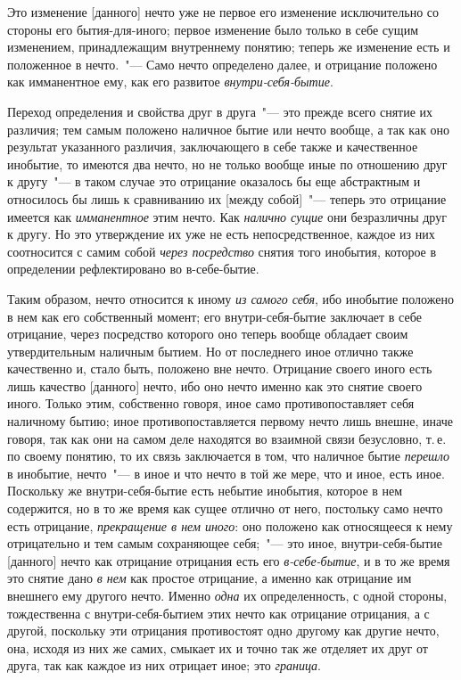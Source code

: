Это изменение [данного] нечто уже не первое его
изменение исключительно со стороны его бытия-для-иного;
первое изменение было только в себе сущим изменением,
принадлежащим внутреннему понятию; теперь
же изменение есть и положенное в нечто.~"--- Само нечто
определено далее, и отрицание положено как имманентное
ему, как его развитое \emph{внутри-себя-бытие}.

Переход определения и свойства друг в друга~"--- это
прежде всего снятие их различия; тем самым положено
наличное бытие или нечто вообще, а так как оно результат
указанного различия, заключающего в себе также и
качественное инобытие, то имеются два нечто, но не
только вообще иные по отношению друг к другу~"--- в таком
случае это отрицание оказалось бы еще абстрактным
и относилось бы лишь к сравниванию их [между собой]~"---
теперь это отрицание имеется как \emph{имманентное} этим
нечто. Как \emph{налично сущие} они безразличны друг к другу.
Но это утверждение их уже не есть непосредственное,
каждое из них соотносится с самим собой \emph{через посредство}
снятия того инобытия, которое в определении рефлектировано
во в-себе-бытие.

Таким образом, нечто относится к иному \emph{из самого
себя}, ибо инобытие положено в нем как его собственный
момент; его внутри-себя-бытие заключает в себе отрицание,
через посредство которого оно теперь вообще обладает
своим утвердительным наличным бытием. Но от
последнего иное отлично также качественно и, стало быть,
положено вне нечто. Отрицание своего иного есть лишь
качество [данного] нечто, ибо оно нечто именно как это
снятие своего иного. Только этим, собственно говоря,
иное само противопоставляет себя наличному бытию;
иное противопоставляется первому нечто лишь внешне,
иначе говоря, так как они на самом деле находятся во
взаимной связи безусловно, т.\,е. по своему понятию, то
их связь заключается в том, что наличное бытие \emph{перешло}
в инобытие, нечто~"--- в иное и что нечто в той же мере,
что и иное, есть иное. Поскольку же внутри-себя-бытие
есть небытие инобытия, которое в нем содержится, но в
то же время как сущее отлично от него, постольку само
нечто есть отрицание, \emph{прекращение в нем иного}: оно положено
как относящееся к нему отрицательно и тем самым
сохраняющее себя;~"--- это иное, внутри-себя-бытие
[данного] нечто как отрицание отрицания есть его \emph{в-себе-бытие},
и в то же время это снятие дано \emph{в нем} как простое
отрицание, а именно как отрицание им внешнего
ему другого нечто. Именно \emph{одна} их определенность, с
одной стороны, тождественна с внутри-себя-бытием этих
нечто как отрицание отрицания, а с другой, поскольку
эти отрицания противостоят одно другому как другие
нечто, она, исходя из них же самих, смыкает их и точно
так же отделяет их друг от друга, так как каждое из них
отрицает иное; это \emph{граница}.

